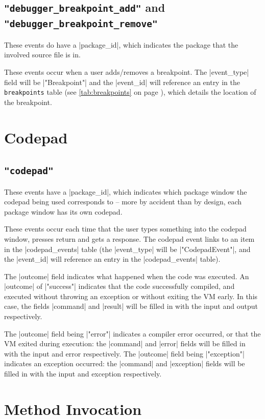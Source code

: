 \documentclass{report}
\newcommand{\myref}[1]{\autoref{#1} on page \pageref*{#1}}
\newcommand{\tabref}[1]{\lstinline|#1| table (see \myref{tab:#1})}
\begin{document}
\subsection{\lstinline!"debugger_breakpoint_add"! and \lstinline!"debugger_breakpoint_remove"!}

These events do have a |package_id|, which indicates the package that the
involved source file is in.

These events occur when a user adds/removes a breakpoint.  The |event_type|
field will be |"Breakpoint"| and the |event_id| will reference an entry in
the \tabref{breakpoints}, which details the location of the breakpoint.


\section{Codepad}

\subsection{\lstinline!"codepad"!}

These events have a |package_id|, which indicates which package window the
codepad being used corresponds to -- more by accident than by design, each
package window has its own codepad.

These events occur each time that the user types something into the codepad
window, presses return and gets a response.  The codepad event links to an item in the |codepad_events| table (the
|event_type| will be |"CodepadEvent"|, and the |event_id| will reference an
entry in the |codepad_events| table).


The |outcome| field indicates what happened when the code was
executed.  An |outcome| of |"success"| indicates that the code
successfully compiled, and executed without throwing an exception or without
exiting the VM early.  In this case, the fields |command| and |result|
will be filled in with the input and output respectively.


The |outcome| field being |"error"| indicates a compiler error occurred, or that the VM
exited during execution: the |command| and |error| fields will be filled in with the
input and error respectively.  The |outcome| field being |"exception"|
indicates an exception occurred: the |command| and |exception| fields
will be filled in with the input and exception respectively.


\section{Method Invocation}
\end{document}
